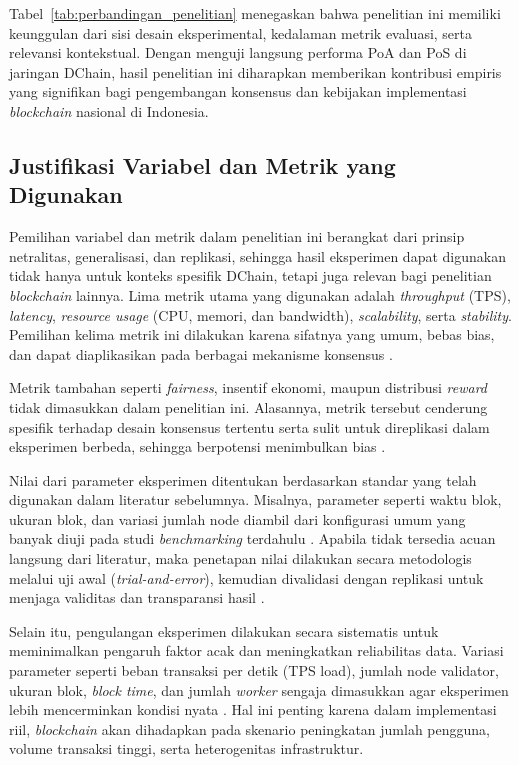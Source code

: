 Tabel~\ref{tab:perbandingan_penelitian} menegaskan bahwa penelitian ini memiliki keunggulan dari sisi desain eksperimental, kedalaman metrik evaluasi, serta relevansi kontekstual. Dengan menguji langsung performa PoA dan PoS di jaringan DChain, hasil penelitian ini diharapkan memberikan kontribusi empiris yang signifikan bagi pengembangan konsensus dan kebijakan implementasi \textit{blockchain} nasional di Indonesia.


\subsection{Justifikasi Variabel dan Metrik yang Digunakan}

Pemilihan variabel dan metrik dalam penelitian ini berangkat dari prinsip netralitas, generalisasi, dan replikasi, sehingga hasil eksperimen dapat digunakan tidak hanya untuk konteks spesifik DChain, tetapi juga relevan bagi penelitian \textit{blockchain} lainnya. Lima metrik utama yang digunakan adalah \textit{throughput} (TPS), \textit{latency}, \textit{resource usage} (CPU, memori, dan bandwidth), \textit{scalability}, serta \textit{stability}. Pemilihan kelima metrik ini dilakukan karena sifatnya yang umum, bebas bias, dan dapat diaplikasikan pada berbagai mekanisme konsensus \cite{fan2020, dinh2017}.

Metrik tambahan seperti \textit{fairness}, insentif ekonomi, maupun distribusi \textit{reward} tidak dimasukkan dalam penelitian ini. Alasannya, metrik tersebut cenderung spesifik terhadap desain konsensus tertentu serta sulit untuk direplikasi dalam eksperimen berbeda, sehingga berpotensi menimbulkan bias \cite{fan2020}.

Nilai dari parameter eksperimen ditentukan berdasarkan standar yang telah digunakan dalam literatur sebelumnya. Misalnya, parameter seperti waktu blok, ukuran blok, dan variasi jumlah node diambil dari konfigurasi umum yang banyak diuji pada studi \textit{benchmarking} terdahulu \cite{dinh2017, thakkar2018}. Apabila tidak tersedia acuan langsung dari literatur, maka penetapan nilai dilakukan secara metodologis melalui uji awal (\textit{trial-and-error}), kemudian divalidasi dengan replikasi untuk menjaga validitas dan transparansi hasil \cite{kaur2021}.

Selain itu, pengulangan eksperimen dilakukan secara sistematis untuk meminimalkan pengaruh faktor acak dan meningkatkan reliabilitas data. Variasi parameter seperti beban transaksi per detik (TPS load), jumlah node validator, ukuran blok, \textit{block time}, dan jumlah \textit{worker} sengaja dimasukkan agar eksperimen lebih mencerminkan kondisi nyata \cite{thakkar2018, kuzlu2019}. Hal ini penting karena dalam implementasi riil, \textit{blockchain} akan dihadapkan pada skenario peningkatan jumlah pengguna, volume transaksi tinggi, serta heterogenitas infrastruktur.

